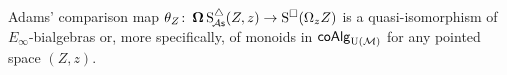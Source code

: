 \begin{lemma}\label{l:adams comparison is an e-infty bialgebra map}
	Adams' comparison map $\theta_Z \colon \operatorname{\mathbf{\Omega}} \operatorname{S^{\triangle}_{\!{\mathcal{A}\mathsf{s}}}}(Z,z) \to \operatorname{S^{\square}}(\Omega_z Z)$ is a quasi-isomorphism of $E_{\infty}$-bialgebras or, more specifically, of monoids in $\mathsf{coAlg}_{\operatorname{U}(\mathcal{M})}$ for any pointed space $(Z,z)$.
\end{lemma}